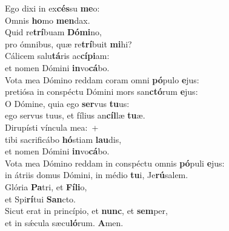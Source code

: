 \evenverse Ego dixi in ex\textbf{cés}su \textbf{me}o:~\*\\
\evenverse Omnis \textbf{ho}mo \textbf{men}dax.\\
\oddverse Quid re\textbf{trí}buam \textbf{Dó}\textbf{mi}no,~\*\\
\oddverse pro ómnibus, quæ re\textbf{trí}buit \textbf{mi}hi?\\
\evenverse Cálicem salu\textbf{tá}ris ac\textbf{cí}\textbf{pi}am:~\*\\
\evenverse et nomen Dómini \textbf{in}vo\textbf{cá}bo.\\
\oddverse Vota mea Dómino reddam coram omni \textbf{pó}pulo \textbf{e}jus:~\*\\
\oddverse pretiósa in conspéctu Dómini mors san\textbf{ctó}rum \textbf{e}jus:\\
\evenverse O Dómine, quia ego \textbf{ser}vus \textbf{tu}us:~\*\\
\evenverse ego servus tuus, et fílius an\textbf{cíl}læ \textbf{tu}æ.\\
\oddverse Dirupísti víncula mea:~+\\
\oddverse  tibi sacrificábo \textbf{hó}stiam \textbf{lau}dis,~\*\\
\oddverse et nomen Dómini \textbf{in}vo\textbf{cá}bo.\\
\evenverse Vota mea Dómino reddam in conspéctu omnis \textbf{pó}puli \textbf{e}jus:~\*\\
\evenverse in átriis domus Dómini, in médio \textbf{tu}i, Je\textbf{rú}salem.\\
\oddverse Glória \textbf{Pa}tri, et \textbf{Fí}\textbf{li}o,~\*\\
\oddverse et Spi\textbf{rí}tui \textbf{San}cto.\\
\evenverse Sicut erat in princípio, et \textbf{nunc}, et \textbf{sem}per,~\*\\
\evenverse et in sǽcula sæcu\textbf{ló}rum. \textbf{A}men.\\
